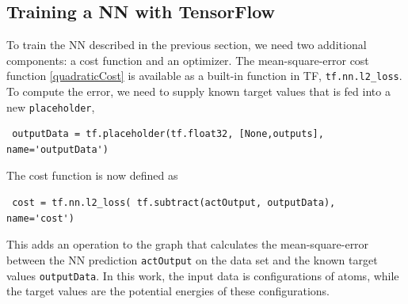 \documentclass[twoside,english]{uiofysmaster}
\begin{document}
\subsection{Training a NN with TensorFlow} 
To train the NN described in the previous section, we need two additional components:
a cost function and an optimizer. The mean-square-error cost function \eqref{quadraticCost} is available as a 
built-in function in TF, \texttt{tf.nn.l2\_loss}. To compute the error, we need to supply known 
target values that is fed into a new \texttt{placeholder},
\begin{verbatim}
 outputData = tf.placeholder(tf.float32, [None,outputs], name='outputData')
\end{verbatim}
The cost function is now defined as
\begin{verbatim}
 cost = tf.nn.l2_loss( tf.subtract(actOutput, outputData), name='cost')
\end{verbatim}
This adds an operation to the graph that calculates the mean-square-error between the NN prediction \texttt{actOutput}
on the data set
and the known target values \texttt{outputData}. In this work, the input data is configurations of atoms, 
while the target values are the potential energies of these configurations. 
\end{document}
